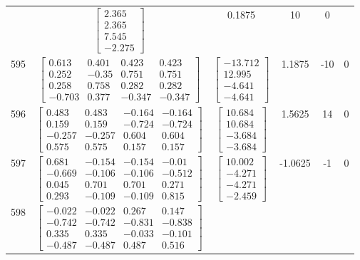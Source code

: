 \documentclass[a4paper,12pt]{article}
\begin{document}
\begin{tabular}{c c c c c c}
&
$\begin{bmatrix} 2.365 \\ 2.365 \\ 7.545 \\ -2.275 \end{bmatrix}$
&
0.1875
&
10
&
0
\\
595
&
$\begin{bmatrix} 0.613 & 0.401 & 0.423 & 0.423 \\ 0.252 & -0.35 & 0.751 & 0.751 \\ 0.258 & 0.758 & 0.282 & 0.282 \\ -0.703 & 0.377 & -0.347 & -0.347 \end{bmatrix}$
&
$\begin{bmatrix} -13.712 \\ 12.995 \\ -4.641 \\ -4.641 \end{bmatrix}$
&
1.1875
&
-10
&
0
\\
596
&
$\begin{bmatrix} 0.483 & 0.483 & -0.164 & -0.164 \\ 0.159 & 0.159 & -0.724 & -0.724 \\ -0.257 & -0.257 & 0.604 & 0.604 \\ 0.575 & 0.575 & 0.157 & 0.157 \end{bmatrix}$
&
$\begin{bmatrix} 10.684 \\ 10.684 \\ -3.684 \\ -3.684 \end{bmatrix}$
&
1.5625
&
14
&
0
\\
597
&
$\begin{bmatrix} 0.681 & -0.154 & -0.154 & -0.01 \\ -0.669 & -0.106 & -0.106 & -0.512 \\ 0.045 & 0.701 & 0.701 & 0.271 \\ 0.293 & -0.109 & -0.109 & 0.815 \end{bmatrix}$
&
$\begin{bmatrix} 10.002 \\ -4.271 \\ -4.271 \\ -2.459 \end{bmatrix}$
&
-1.0625
&
-1
&
0
\\
598
&
$\begin{bmatrix} -0.022 & -0.022 & 0.267 & 0.147 \\ -0.742 & -0.742 & -0.831 & -0.838 \\ 0.335 & 0.335 & -0.033 & -0.101 \\ -0.487 & -0.487 & 0.487 & 0.516 \end{bmatrix}$

\end{tabular}
\end{document}
